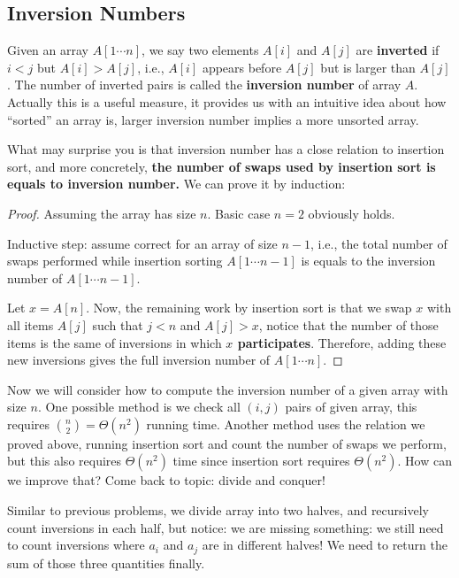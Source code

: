 \documentclass[11pt, a4paper]{COMP3711}
\begin{document}
\begin{spacing}{1.5}
    \section{Inversion Numbers}

    Given an array $A[1\cdots n]$, we say two elements $A[i]$ and $A[j]$
    are {\bf inverted} if $i<j$ but $A[i]>A[j]$, i.e., $A[i]$ appears
    before $A[j]$ but is larger than $A[j]$. The number of inverted pairs
    is called the {\bf inversion number} of array $A$. 
    Actually this is a useful measure, it provides us with an intuitive
    idea about how ``sorted'' an array is, larger inversion number implies
    a more unsorted array.

    What may surprise you is that inversion number has a close relation
    to insertion sort, and more concretely, {\bf the number of swaps
    used by insertion sort is equals to inversion number.}
    We can prove it by induction:
    
    \begin{proof}
        Assuming the array has size $n$. Basic case
        $n=2$ obviously holds.

        Inductive step: assume correct for an array of size $n-1$, i.e.,
        the total number of swaps performed while insertion sorting
        $A[1\cdots n-1]$ is equals to the inversion number of $A[1\cdots n-1]$.

        Let $x=A[n]$. Now, the remaining work by insertion sort is that we swap 
        $x$ with all items $A[j]$ such that $j<n$ and $A[j]>x$, 
        notice that the number of those items is the same of inversions in which
        {\bf $x$ participates}. Therefore, adding these new inversions gives
        the full inversion number of $A[1\cdots n]$.
    \end{proof}

    Now we will consider how to compute the inversion number of a given 
    array with size $n$. One possible method is we check all $(i,j)$
    pairs of given array, this requires ${n\choose 2}=\Theta(n^2)$
    running time. Another method uses the relation we proved above,
    running insertion sort and count the number of swaps we perform,
    but this also requires $\Theta(n^2)$ time since insertion sort 
    requires $\Theta(n^2)$. How can we improve that? 
    Come back to topic: divide and conquer!

    Similar to previous problems, we divide array into two halves, 
    and recursively count inversions in each half, but notice:
    we are missing something: we still need to count inversions
    where $a_i$ and $a_j$ are in different halves! We need 
    to return the sum of those three quantities finally.


\end{spacing}
\end{document}
